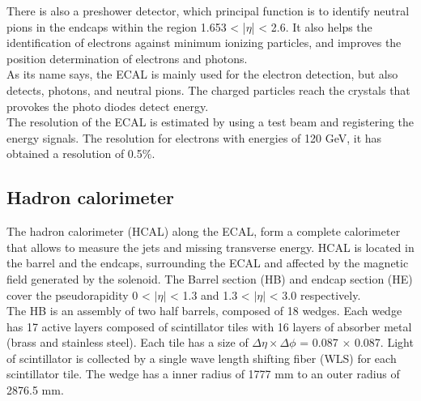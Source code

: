 There is also a preshower detector, which principal function is to identify neutral pions in the
endcaps within the region 1.653 < |$\eta$| < 2.6. It also helps the identification of electrons
against minimum ionizing particles, and improves the position determination of electrons and photons.
\\

As its name says, the ECAL is mainly used for the electron detection, but also detects, photons, and neutral pions. The charged particles reach the crystals that provokes the photo diodes detect energy.\\
The resolution of the ECAL is estimated by using a test beam and registering the energy signals. The resolution for electrons with energies of 120 GeV, it has obtained a resolution of 0.5$\%$.
 


\subsection{Hadron calorimeter}
The hadron calorimeter (HCAL) along the ECAL, form a complete calorimeter that allows to measure the jets and missing transverse energy. HCAL is located in the barrel and the endcaps, surrounding the ECAL and affected by the magnetic field generated by the solenoid. The Barrel section (HB) and endcap section (HE) cover the pseudorapidity 0 < $|\eta|$ < 1.3 and 1.3 < $|\eta|$ < 3.0 respectively.\\ 


The HB is an assembly of two half barrels, composed of 18 wedges. Each wedge has 17 active layers composed of scintillator tiles with 16 layers of absorber metal (brass and stainless steel). Each tile has a size of $\Delta \eta × \Delta \phi$ = 0.087 $\times$ 0.087. Light of scintillator is collected by a single wave
length shifting fiber (WLS) for each scintillator tile. The wedge has a inner radius of 1777 mm to an outer radius of 2876.5 mm. 
\\

